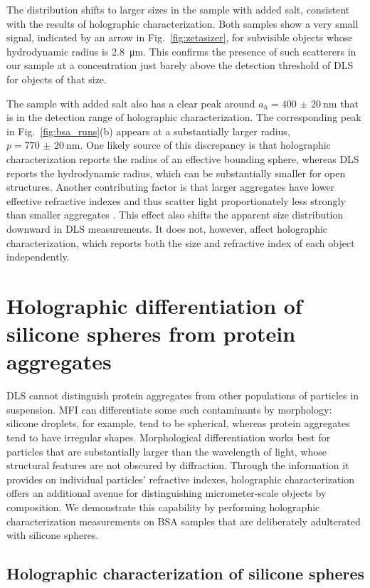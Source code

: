The distribution shifts to larger sizes in the sample with added salt, consistent with 
the results of holographic characterization. Both samples show a very small signal, 
indicated by an arrow in Fig.~\ref{fig:zetasizer}, for subvisible objects whose 
hydrodynamic radius is \SI{2.8}{\um}. This confirms the presence of such scatterers in 
our sample at a concentration just barely above the detection threshold of DLS for 
objects of that size.

The sample with added salt also has a clear peak around $a_h = \SI{400(20)}{\nm}$ that is 
in the detection range of holographic characterization. The corresponding peak in 
Fig.~\ref{fig:bsa_runs}(b) appears at a substantially larger radius, 
$p = \SI{770(20)}{\nm}$. One likely source of this discrepancy is that holographic 
characterization reports the radius of an effective bounding sphere, whereas DLS reports 
the hydrodynamic radius, which can be substantially smaller for open structures. Another 
contributing factor is that larger aggregates have lower effective refractive indexes and 
thus scatter light proportionately less strongly than smaller aggregates 
\cite{feder84, cheong11}. This effect also shifts the apparent size distribution downward 
in DLS measurements. It does not, however, affect holographic characterization, which 
reports both the size and refractive index of each object independently.

\section{Holographic differentiation of silicone spheres from protein aggregates}

DLS cannot distinguish protein aggregates from other populations of particles in 
suspension. MFI can differentiate some such contaminants by morphology: silicone 
droplets, for example, tend to be spherical, whereas protein aggregates tend to have 
irregular shapes. Morphological differentiation works best for particles that are 
substantially larger than the wavelength of light, whose structural features are not 
obscured by diffraction. Through the information it provides on individual particles’ 
refractive indexes, holographic characterization offers an additional avenue for 
distinguishing micrometer-scale objects by composition. We demonstrate this capability by 
performing holographic characterization measurements on BSA samples that are deliberately 
adulterated with silicone spheres.

\subsection{Holographic characterization of silicone spheres}

